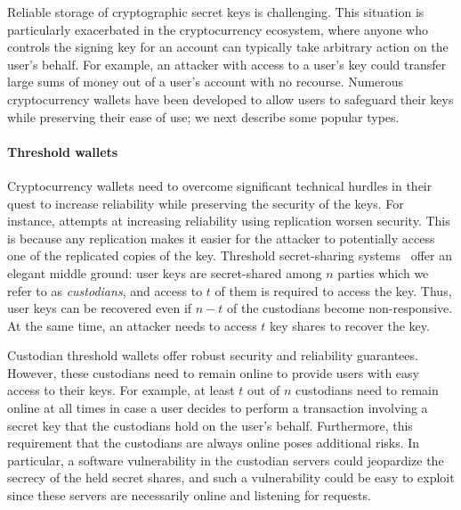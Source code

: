 Reliable storage of cryptographic secret keys is challenging. This situation is particularly exacerbated in the cryptocurrency ecosystem, where anyone who controls the signing key for an account can typically take arbitrary action on the user's behalf. For example, an attacker with access to a user's key could transfer large sums of money out of a user's account with no recourse. Numerous cryptocurrency wallets have been developed to allow users to safeguard their keys while preserving their ease of use; we next describe some popular types.

\paragraph{Threshold wallets} Cryptocurrency wallets need to overcome significant technical hurdles in their quest to increase reliability while preserving the security of the keys.
For instance, attempts at increasing reliability using replication worsen security. This is because any replication makes it easier for the attacker to potentially access one of the replicated copies of the key. Threshold secret-sharing systems~\cite{CACM:Shamir79} offer an elegant middle ground: user keys are secret-shared among $n$ parties which we refer to as \emph{custodians}, and access to $t$ of them is required to access the key. Thus, user keys can be recovered even if $n-t$ of the custodians become non-responsive. At the same time, an attacker needs to access $t$ key shares to recover the key. 

Custodian threshold wallets offer robust security and reliability guarantees. However, these custodians need to remain online to provide users with easy access to their keys. For example, at least $t$ out of $n$ custodians need to remain online at all times in case a user decides to perform a transaction involving a secret key that the custodians hold on the user's behalf. Furthermore, this requirement that the custodians are always online poses additional risks. In particular, a software vulnerability in the custodian servers could jeopardize the secrecy of the held secret shares, and such a vulnerability could be easy to exploit since these servers are necessarily online and listening for requests. 

